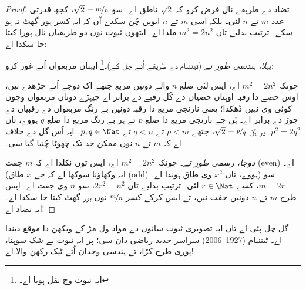 \documentclass[../../../include/open-logic-section]{subfiles}
\begin{document}
\begin{proof}
تضاد دے طریقے نال فرض کرو کہ $\sqrt{2}$ ناطق اے۔ سو
$\sqrt{2} = \nicefrac{m}{n}$، کجھ قدرتی عدد $m$ تے $n$ لئی۔ بلکہ اسی
$m$ تے $n$ ایویں چُن سکدے آں کہ ایہ کسر ہور گھٹ نہ ہو سکے۔ ترتیب بدلیے تاں
$m^{2} = 2n^{2}$ ملدا اے۔ ایتھوں ثبوت نوں دو طریقیاں نال پورا کیتا جا
سکدا اے:

\emph{پہلا، ہندسی طور تے} (ٹیننبام دے طریقے اُتے چل کے)۔\footnote{ایہ
ثبوت \cite{Conway2006} وچ نقل ہویا اے۔} ایہناں مربعواں اُتے غور کرو:
\begin{center}
\end{center}
چونکہ $m^2 = 2n^2$ اے، ایس لئی ضلع $n$ والے دونیں مربع جتھے اک دوجے
اُتے چڑھدے نیں، اوس حصے دا رقبہ اوہناں حصیاں دے کُل رقبے دے برابر اے
جیہڑے دوناں مربعواں وچوں کوئی وی نہیں ڈھکدا؛ یعنی نارنجی مربع دا رقبہ
دونیں بے رنگ مربعواں دے رقبیاں دے جوڑ دے برابر اے۔ ہُن جے نارنجی مربع
دا ضلع $p$ تے ہر بے رنگ مربع دا ضلع $q$ ہووے، تاں $p^2 = 2q^2$۔ پر
ہُن $\sqrt{2} = \nicefrac{p}{q}$، جتھے $p < m$ تے $q < n$ تے $p, q
\in \Nat$۔ ایہ اُس گل دے خلاف اے کہ $m$ تے $n$ نوں ممکن حد تک چھوٹا
چُنیا گیا سی۔

\emph{دوجا، رسمی طور تے۔} چونکہ $m^{2} = 2n^{2}$ اے، ایس توں نکلدا اے
کہ $m$ جفت (even) اے۔ (ایہ وکھاؤنا سوکھا اے کہ جے $x$ طاق (odd)
ہووے، تاں $x^2$ وی طاق ہوندا اے۔) سو $m = 2r$، کسے $r \in \Nat$
لئی۔ ترتیب بدلیے تاں $2r^2 = n^2$،
سو $n$ وی جفت اے۔ ایس طرح $m$ تے $n$ دونیں جفت نیں، تے ایس کرکے
کسر $\nicefrac{m}{n}$ نوں \emph{ہور} گھٹ کیتا جا سکدا اے۔ ایہ تضاد اے!
\end{proof}

گل چل پئی اے تاں ایہ تصویری ثبوت سانوں
 دے مواد ول مڑ کے ویکھن دا موقع دیندا
اے۔ ٹیننبام (1927--2006) سراسر جدید ریاضی دان سی؛ پر ایہ ثبوت بے شک
سوہنا، پوری طرح کڑا، تے ہندسی وجدان اُتے ٹیک رکھن والا اے!
\end{document}
